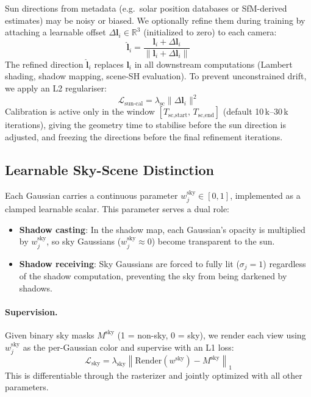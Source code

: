 Sun directions from metadata (e.g.\ solar position databases or SfM-derived estimates) may be noisy or biased.
We optionally refine them during training by attaching a learnable offset $\Delta\mathbf{l}_i \in \mathbb{R}^3$ (initialized to zero) to each camera:
\begin{equation}
    \hat{\mathbf{l}}_i = \frac{\mathbf{l}_i + \Delta\mathbf{l}_i}{\|\mathbf{l}_i + \Delta\mathbf{l}_i\|}
    \label{eq:sun_cal}
\end{equation}
The refined direction $\hat{\mathbf{l}}_i$ replaces $\mathbf{l}_i$ in all downstream computations (Lambert shading, shadow mapping, scene-SH evaluation).
To prevent unconstrained drift, we apply an L2 regulariser:
\begin{equation}
    \mathcal{L}_{\text{sun-cal}} = \lambda_{\text{sc}} \|\Delta\mathbf{l}_i\|^2
    \label{eq:sun_cal_reg}
\end{equation}
Calibration is active only in the window $[T_{\text{sc,start}},\, T_{\text{sc,end}}]$ (default 10\,k--30\,k iterations), giving the geometry time to stabilise before the sun direction is adjusted, and freezing the directions before the final refinement iterations.

\subsection{Learnable Sky-Scene Distinction}
\label{sec:sky_mask}

Each Gaussian carries a continuous parameter $w_j^{\text{sky}} \in [0, 1]$, implemented as a clamped learnable scalar.
This parameter serves a dual role:
\begin{itemize}
    \item \textbf{Shadow casting}: In the shadow map, each Gaussian's opacity is multiplied by $w_j^{\text{sky}}$, so sky Gaussians ($w_j^{\text{sky}} \approx 0$) become transparent to the sun.
    \item \textbf{Shadow receiving}: Sky Gaussians are forced to fully lit ($\sigma_j = 1$) regardless of the shadow computation, preventing the sky from being darkened by shadows.
\end{itemize}

\paragraph{Supervision.}
Given binary sky masks $M^{\text{sky}}$ (1 = non-sky, 0 = sky), we render each view using $w_j^{\text{sky}}$ as the per-Gaussian color and supervise with an L1 loss:
\begin{equation}
    \mathcal{L}_{\text{sky}} = \lambda_{\text{sky}} \left\| \text{Render}(w^{\text{sky}}) - M^{\text{sky}} \right\|_1
    \label{eq:sky_loss}
\end{equation}
This is differentiable through the rasterizer and jointly optimized with all other parameters.

